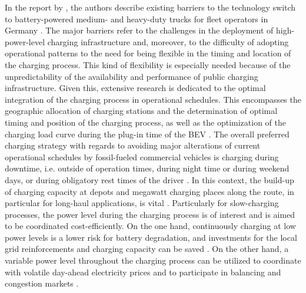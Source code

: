 \documentclass[final,10pt]{elsarticle}
\begin{document}
        In the report by \citeauthor{Scherrer2024Requirements}, the authors describe existing barriers to the technology switch to battery-powered medium- and heavy-duty trucks for fleet operators in Germany \cite{Scherrer2024Requirements}. The major barriers refer to the challenges in the deployment of high-power-level charging infrastructure and, moreover, to the difficulty of adopting operational patterns to the need for being flexible in the timing and location of the charging process. This kind of flexibility is especially needed because of the unpredictability of the availability and performance of public charging infrastructure. Given this, extensive research is dedicated to the optimal integration of the charging process in operational schedules. This encompasses the geographic allocation of charging stations and the determination of optimal timing and position of the charging process, as well as the optimization of the charging load curve during the plug-in time of the \ac{BEV} \cite{Shoman2023Public, 7947231, KARMALI2024101397}. The overall preferred charging strategy with regards to avoiding major alterations of current operational schedules by fossil-fueled commercial vehicles is charging during downtime, i.e. outside of operation times, during night time or during weekend days, or during obligatory rest times of the driver \cite{teoh2022, Shoman2023Public}. In this context, the build-up of charging capacity at depots and megawatt charging places along the route, in particular for long-haul applications, is vital \cite{SPETH2024104078}. Particularly for slow-charging processes, the power level during the charging process is of interest and is aimed to be coordinated cost-efficiently. On the one hand, continuously charging at low power levels is a lower risk for battery degradation, and investments for the local grid reinforcements and charging capacity can be saved \cite{Borlaug2021}. On the other hand, a variable power level throughout the charging process can be utilized to coordinate with volatile day-ahead electricity prices and to participate in balancing and congestion markets \cite{ag2022flexibility, MANZOLLI2022124252}. 
\end{document}
